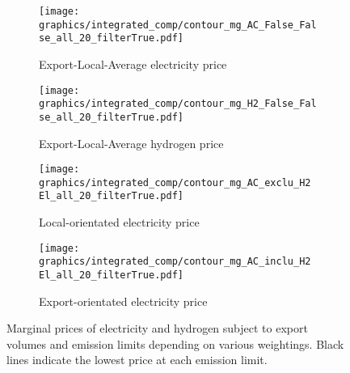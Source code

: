 \begin{figure*}[h] %
    \centering
    \begin{subfigure}[b]{0.45\linewidth}
        \centering
        \texttt{[image: graphics/integrated\_comp/contour\_mg\_AC\_False\_False\_all\_20\_filterTrue.pdf]}
        \caption{Export-Local-Average electricity price}
        \label{fig:export_local_el_price}
    \end{subfigure}
    \hfill
    \begin{subfigure}[b]{0.45\linewidth}
        \centering
        \texttt{[image: graphics/integrated\_comp/contour\_mg\_H2\_False\_False\_all\_20\_filterTrue.pdf]}
        \caption{Export-Local-Average hydrogen price}
        \label{fig:export_local_hy_price}
    \end{subfigure}
    \hfill
    \begin{subfigure}[b]{0.45\linewidth}
        \centering
        \texttt{[image: graphics/integrated\_comp/contour\_mg\_AC\_exclu\_H2 El\_all\_20\_filterTrue.pdf]}
        \caption{Local-orientated electricity price}
        \label{fig:local_el_price_appendix}
    \end{subfigure}
    \hfill
    \begin{subfigure}[b]{0.45\linewidth}
        \centering
        \texttt{[image: graphics/integrated\_comp/contour\_mg\_AC\_inclu\_H2 El\_all\_20\_filterTrue.pdf]}
        \caption{Export-orientated electricity price}
        \label{fig:export_el_price}
    \end{subfigure}
    \hfill

    \caption{Marginal prices of electricity and hydrogen subject to export volumes and emission limits depending on various weightings. Black lines indicate the lowest price at each emission limit.}
    \label{fig:prices_all}
\end{figure*}

\clearpage
